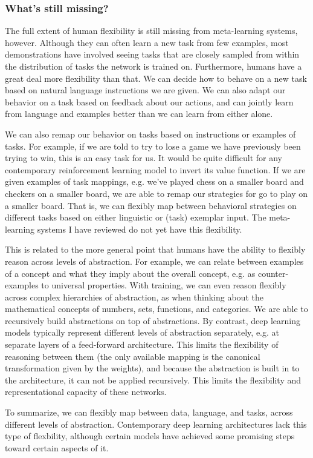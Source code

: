 \documentclass[11pt]{article}
\begin{document}
\subsubsection{What's still missing?}

The full extent of human flexibility is still missing from meta-learning systems, however. Although they can often learn a new task from few examples, most demonstrations have involved seeing tasks that are closely sampled from within the distribution of tasks the network is trained on. Furthermore, humans have a great deal more flexibility than that. We can decide how to behave on a new task based on natural language instructions we are given. We can also adapt our behavior on a task based on feedback about our actions, and can jointly learn from language and examples better than we can learn from either alone. \par
We can also remap our behavior on tasks based on instructions or examples of tasks. For example, if we are told to try to lose a game we have previously been trying to win, this is an easy task for us. It would be quite difficult for any contemporary reinforcement learning model to invert its value function. If we are given examples of task mappings, e.g. we've played chess on a smaller board and checkers on a smaller board, we are able to remap our strategies for go to play on a smaller board. That is, we can flexibly map between behavioral strategies on different tasks based on either linguistic or (task) exemplar input. The meta-learning systems I have reviewed do not yet have this flexibility. \par
This is related to the more general point that humans have the ability to flexibly reason across levels of abstraction. For example, we can relate between examples of a concept and what they imply about the overall concept, e.g. as counter-examples to universal properties. With training, we can even reason flexibly across complex hierarchies of abstraction, as when thinking about the mathematical concepts of numbers, sets, functions, and categories. We are able to recursively build abstractions on top of abstractions. By contrast, deep learning models typically represent different levels of abstraction separately, e.g. at separate layers of a feed-forward architecture. This limits the flexibility of reasoning between them (the only available mapping is the canonical transformation given by the weights), and because the abstraction is built in to the architecture, it can not be applied recursively. This limits the flexibility and representational capacity of these networks. \par 
To summarize, we can flexibly map between data, language, and tasks, across different levels of abstraction. Contemporary deep learning architectures lack this type of flexbility, although certain models have achieved some promising steps toward certain aspects of it. \par 
\end{document}
